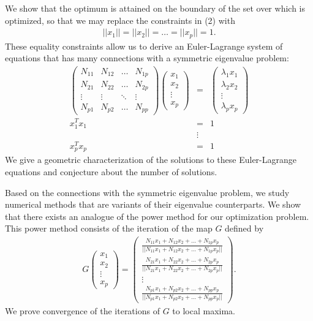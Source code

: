 \documentclass{report}
\begin{document}
We show that the optimum is attained on the boundary of the set over which
is optimized, so that we may replace the constraints in (2) with
\begin{eqnarray}
||x_1||=||x_2||=\hdots=||x_p||=1.
\end{eqnarray}
These equality constraints allow us to derive an Euler-Lagrange system of
equations that has many connections with a symmetric eigenvalue problem:
\begin{eqnarray*}
\left(\begin{array}{cccc}N_{11}&N_{12}&\hdots&N_{1p}\\
N_{21}&N_{22}&\hdots&N_{2p}\\
\vdots&\vdots&\ddots&\vdots\\
N_{p1}&N_{p2}&\hdots&N_{pp}\end{array}\right)
\left(\begin{array}{c}x_1\\x_2\\ \vdots\\ x_p \end{array}\right)&=&
\left(\begin{array}{c}\lambda_1x_1\\ \lambda_2 x_2\\ \vdots\\
\lambda_p x_p \end{array} \right )\\
x_1^Tx_1&=&1\\
&\vdots&\\
x_p^Tx_p&=&1
\end{eqnarray*}
We give a geometric characterization of the solutions to these
Euler-Lagrange equations and conjecture about the number
of solutions.

Based on the connections with the symmetric eigenvalue problem,
we study numerical methods that are variants of their eigenvalue
counterparts. We show that there exists an analogue of the power method
for our optimization problem. This power method consists of the iteration
of the map $G$ defined by
\begin{eqnarray}
G\left(\begin{array}{c}x_1\\x_2\\ \vdots\\x_p\end{array}\right)
=\left ( \begin{array}{c} \frac{N_{11}x_1+N_{12}x_2+ \hdots +N_{1p}x_p}
{||N_{11}x_1+N_{12}x_2+ \hdots +N_{1p}x_p||} \\
\frac{N_{21}x_1+N_{22}x_2+ \hdots +N_{2p}x_p}
{||N_{21}x_1+N_{22}x_2+ \hdots +N_{2p}x_p||} \\
\vdots \\
\frac{N_{p1}x_1+N_{p2}x_2+ \hdots +N_{pp}x_p}
{||N_{p1}x_1+N_{p2}x_2+ \hdots +N_{pp}x_p||}
\end{array} \right ).
\end{eqnarray}
We prove convergence of the iterations of $G$ to local maxima.
\end{document}
